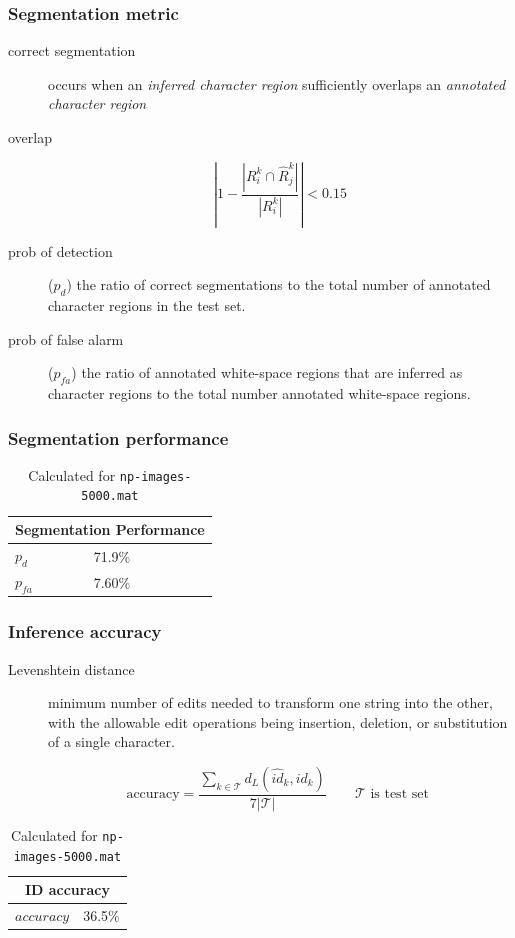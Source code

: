 \documentclass{beamer}
\newcommand{\test}{\ensuremath{\mathcal{T}}}
\begin{document}
\begin{frame}
  \frametitle{Segmentation metric}
\begin{description}
\item[correct segmentation] occurs when an \emph{inferred character
  region} sufficiently overlaps an \emph{annotated character region}
\item[overlap]
\[
\left|1-\frac{|R^k_i \cap \hat{R}^k_j|}{|R^k_i|}\right| < 0.15
\]   
\item[prob of detection] ($p_d$) the ratio of correct segmentations to
  the total number of annotated character regions in the test set.
\item[prob of false alarm] ($p_{fa}$) the ratio of annotated
  white-space regions that are inferred as character regions to the
  total number annotated white-space regions.
\end{description}
\end{frame}

\begin{frame}
  \frametitle{Segmentation performance}
  \begin{table}[ht]
    \begin{center}
      \begin{tabular}{|l|l|}
        \hline
        \multicolumn{2}{|c|}{Segmentation Performance} \\
        \hline
        $p_d$ & 71.9\% \\
        $p_{fa}$ & 7.60\% \\
        \hline
      \end{tabular}
      \caption{Calculated for \texttt{np-images-5000.mat}}
      \label{table:segmentation}
    \end{center}
  \end{table}
\end{frame}

\begin{frame}
\frametitle{Inference accuracy}
\begin{description}
\item[Levenshtein distance] minimum number of edits needed to transform one string into the
other, with the allowable edit operations being insertion, deletion,
or substitution of a single character.

\[ \text{accuracy} = \frac{\sum_{k \in \test}
  d_L(\hat{id}_k,id_k)}{7|\test|} \qquad \test \text{ is test set }  \]
\end{description}

\begin{table}[ht]
\begin{center}
\begin{tabular}{|l|l|}
  \hline
  \multicolumn{2}{|c|}{ID accuracy} \\
  \hline
  $accuracy$ & 36.5\% \\
  \hline
\end{tabular}
\caption{Calculated for \texttt{np-images-5000.mat}}
\end{center}
\end{table} 
  
\end{frame}
\end{document}
